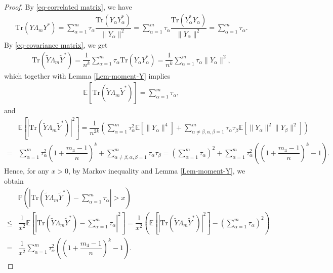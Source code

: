 \documentclass[12pt]{article}
\numberwithin{equation}{section} \theoremstyle{plain}
\def\bE{\mathbb E}
\def\bP{\mathbb P}
\def\Tr{\mathrm {Tr}}
\begin{document}
\begin{proof}
By \eqref{eq-correlated matrix}, we have
\begin{align} \label{ineq-trace-bound-1}
    \Tr \left( Y \Lambda_m Y^* \right)
    = \sum_{\alpha=1}^m \tau_\alpha \dfrac{\Tr \left( Y_{\alpha} Y_{\alpha}^* \right)}{\|Y_\alpha\|^2}
    = \sum_{\alpha=1}^m \tau_\alpha \dfrac{\Tr \left( Y_{\alpha}^* Y_{\alpha} \right)}{\|Y_\alpha\|^2}
    = \sum_{\alpha=1}^m \tau_\alpha.
\end{align}
By \eqref{eq-covariance matrix}, we get
\begin{align*}
    \Tr \left( \widetilde Y \Lambda_m \widetilde Y^* \right)
    = \dfrac{1}{n^k} \sum_{\alpha=1}^m \tau_{\alpha} \Tr \left( Y_{\alpha} Y_{\alpha}^* \right)
    = \dfrac{1}{n^k} \sum_{\alpha=1}^m \tau_{\alpha} \|Y_{\alpha}\|^2,
\end{align*}
which together with Lemma \ref{Lem-moment-Y} implies
\begin{align*}
    \bE \left[ \Tr \left( \widetilde Y \Lambda_m \widetilde Y^* \right) \right]
    = \sum_{\alpha=1}^m \tau_\alpha,
\end{align*}
and
\begin{align*}
    &\bE \left[ \left| \Tr \left( \widetilde Y \Lambda_m \widetilde Y^* \right) \right|^2 \right]
    = \dfrac{1}{n^{2k}} \left( \sum_{\alpha=1}^m \tau_\alpha^2 \bE \left[ \|Y_\alpha\|^4 \right] + \sum_{\alpha\not=\beta,\alpha,\beta=1}^m \tau_\alpha\tau_\beta \bE \left[ \|Y_\alpha\|^2 \|Y_\beta\|^2 \right] \right) \\
    =& \sum_{\alpha=1}^m \tau_\alpha^2 \left( 1 + \dfrac{m_4-1}{n} \right)^k + \sum_{\alpha\not=\beta,\alpha,\beta=1}^m \tau_\alpha\tau_\beta
    = \left( \sum_{\alpha=1}^m \tau_\alpha \right)^2 + \sum_{\alpha=1}^m \tau_\alpha^2 \left( \left( 1 + \dfrac{m_4-1}{n} \right)^k - 1 \right).
\end{align*}
Hence, for any $x>0$, by Markov inequality and Lemma \ref{Lem-moment-Y}, we obtain
\begin{align} \label{ineq-trace-bound-2}
    &\bP \left( \left| \Tr \left( \widetilde Y \Lambda_m \widetilde Y^* \right) - \sum_{\alpha=1}^m \tau_\alpha \right| > x \right) \nonumber \\
    \le& \dfrac{1}{x^2} \bE \left[ \left| \Tr \left( \widetilde Y \Lambda_m \widetilde Y^* \right) - \sum_{\alpha=1}^m \tau_\alpha \right|^2 \right]
    = \dfrac{1}{x^2} \left( \bE \left[ \left| \Tr \left( \widetilde Y \Lambda_m \widetilde Y^* \right) \right|^2 \right] - \left( \sum_{\alpha=1}^m \tau_\alpha \right)^2 \right) \nonumber \\
    =& \dfrac{1}{x^2} \sum_{\alpha=1}^m \tau_\alpha^2 \left( \left( 1 + \dfrac{m_4-1}{n} \right)^k - 1 \right).

\end{align}
\end{proof}
\end{document}
